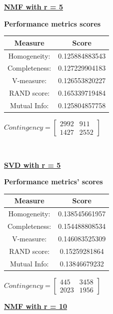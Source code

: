 \documentclass{article}
\begin{document}
\underline{\textbf{NMF with r = 5}} 
\begin{center}
	\textbf{Performance metrics scores} \\ \vspace{10pt}	
	\begin{tabular}{*{2}{c}}
		\toprule
		\textbf{Measure} & \textbf{Score} \\
		\midrule		
		Homogeneity: & 0.125884883543 \\
		\midrule
		Completeness: & 0.127229904183 \\
		\midrule
		V-measure: & 0.126553820227 \\
		\midrule
		RAND score: & 0.165339719484 \\
		\midrule
		Mutual Info: & 0.125804857758 \\
		\bottomrule
	\end{tabular}
	\qquad
	$Contingency = \left[ \begin{array}{*{2}{c}}
		2992  & 911 \\
		1427  & 2552 
		\end{array}\right]
		$
\end{center}
\\ \vspace{20pt}

\underline{\textbf{SVD with r = 5}} 

\begin{center}
	\textbf{Performance metrics' scores} \\ \vspace{10pt}	
	\begin{tabular}{*{2}{c}}
		\toprule
		\textbf{Measure} & \textbf{Score} \\	
		\midrule
		Homogeneity: & 0.138545661957 \\
		\midrule
		Completeness: & 0.154488808534 \\
		\midrule
		V-measure: & 0.146083525309 \\
		\midrule
		RAND score: & 0.15259281864 \\
		\midrule
		Mutual Info: & 0.13846679232 \\
		\bottomrule
	\end{tabular}
	\qquad
	$Contingency = \left[ \begin{array}{*{2}{c}}
		445 	& 3458 \\
		2023 	& 1956 
		\end{array}\right]
		$
\end{center}
\newpage


\underline{\textbf{NMF with r = 10}} 
\end{document}
